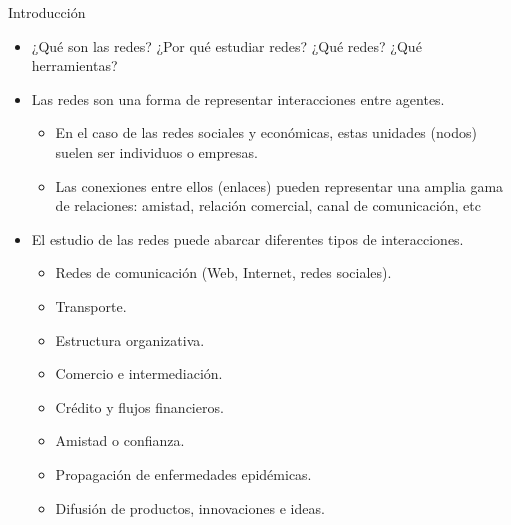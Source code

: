 \documentclass[11pt]{beamer}
\begin{document}
\begin{frame}{Introducción}
    \begin{itemize}
        \item ¿Qué son las redes? ¿Por qué estudiar redes? ¿Qué redes?
¿Qué herramientas?
\item Las redes son una forma de representar interacciones entre agentes.
\begin{itemize}
    \item En el caso de las redes sociales y económicas, estas unidades (nodos) suelen ser individuos o empresas.
\item Las conexiones entre ellos (enlaces) pueden representar una amplia gama de relaciones: amistad, relación comercial, canal de comunicación, etc
\end{itemize}
\item El estudio de las redes puede abarcar diferentes tipos de interacciones.
\begin{itemize}
    \item Redes de comunicación (Web, Internet, redes sociales).
    \item Transporte.
\item  Estructura organizativa.
\item  Comercio e intermediación.
\item  Crédito y ﬂujos financieros.
\item Amistad o confianza.
\item Propagación de enfermedades epidémicas.
\item Difusión de productos, innovaciones e ideas.
\end{itemize}
    \end{itemize}
\end{frame}
\end{document}
